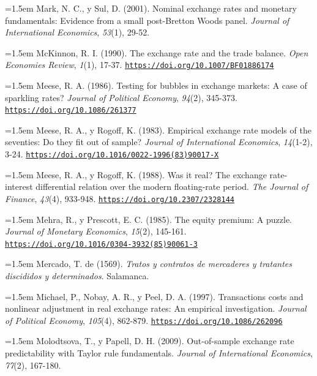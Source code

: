 \documentclass[10pt,a4paper]{article}
\begin{document}
\noindent\hangindent=1.5em Mark, N. C., y Sul, D. (2001). Nominal exchange rates and monetary fundamentals: Evidence from a small post-Bretton Woods panel. \textit{Journal of International Economics}, \textit{53}(1), 29-52.

\noindent\hangindent=1.5em McKinnon, R. I. (1990). The exchange rate and the trade balance. \textit{Open Economies Review}, \textit{1}(1), 17-37. \href{https://doi.org/10.1007/BF01886174}{\nolinkurl{https://doi.org/10.1007/BF01886174}}

\noindent\hangindent=1.5em Meese, R. A. (1986). Testing for bubbles in exchange markets: A case of sparkling rates? \textit{Journal of Political Economy}, \textit{94}(2), 345-373. \href{https://doi.org/10.1086/261377}{\nolinkurl{https://doi.org/10.1086/261377}}

\noindent\hangindent=1.5em Meese, R. A., y Rogoff, K. (1983). Empirical exchange rate models of the seventies: Do they fit out of sample? \textit{Journal of International Economics}, \textit{14}(1-2), 3-24. \href{https://doi.org/10.1016/0022-1996(83)90017-X}{\nolinkurl{https://doi.org/10.1016/0022-1996(83)90017-X}}

\noindent\hangindent=1.5em Meese, R. A., y Rogoff, K. (1988). Was it real? The exchange rate-interest differential relation over the modern floating-rate period. \textit{The Journal of Finance}, \textit{43}(4), 933-948. \href{https://doi.org/10.2307/2328144}{\nolinkurl{https://doi.org/10.2307/2328144}}

\noindent\hangindent=1.5em Mehra, R., y Prescott, E. C. (1985). The equity premium: A puzzle. \textit{Journal of Monetary Economics}, \textit{15}(2), 145-161. \href{https://doi.org/10.1016/0304-3932(85)90061-3}{\nolinkurl{https://doi.org/10.1016/0304-3932(85)90061-3}}

\noindent\hangindent=1.5em Mercado, T. de (1569). \textit{Tratos y contratos de mercaderes y tratantes discididos y determinados}. Salamanca.

\noindent\hangindent=1.5em Michael, P., Nobay, A. R., y Peel, D. A. (1997). Transactions costs and nonlinear adjustment in real exchange rates: An empirical investigation. \textit{Journal of Political Economy}, \textit{105}(4), 862-879. \href{https://doi.org/10.1086/262096}{\nolinkurl{https://doi.org/10.1086/262096}}

\noindent\hangindent=1.5em Molodtsova, T., y Papell, D. H. (2009). Out-of-sample exchange rate predictability with Taylor rule fundamentals. \textit{Journal of International Economics}, \textit{77}(2), 167-180.
\end{document}
